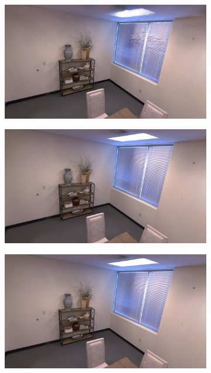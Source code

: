 \begin{figure}[ht]
\begin{subfigure}[ht]{0.24\linewidth}
    \end{subfigure}
    \begin{subfigure}[ht]{0.24\linewidth}
        \includegraphics[width=1\linewidth]{fig/fig_mono/replica/room2_/photo-SLAM/frame000752.jpg}
    \end{subfigure}
    \begin{subfigure}[ht]{0.24\linewidth}
        \includegraphics[width=1\linewidth]{fig/fig_mono/replica/room2_/HQ-SLAM/30000_752.jpg}
    \end{subfigure}
    \begin{subfigure}[ht]{0.24\linewidth}
        \includegraphics[width=1\linewidth]{fig/fig_mono/replica/room2_/gt/30000_752.jpg}

\end{subfigure}
\end{figure}
